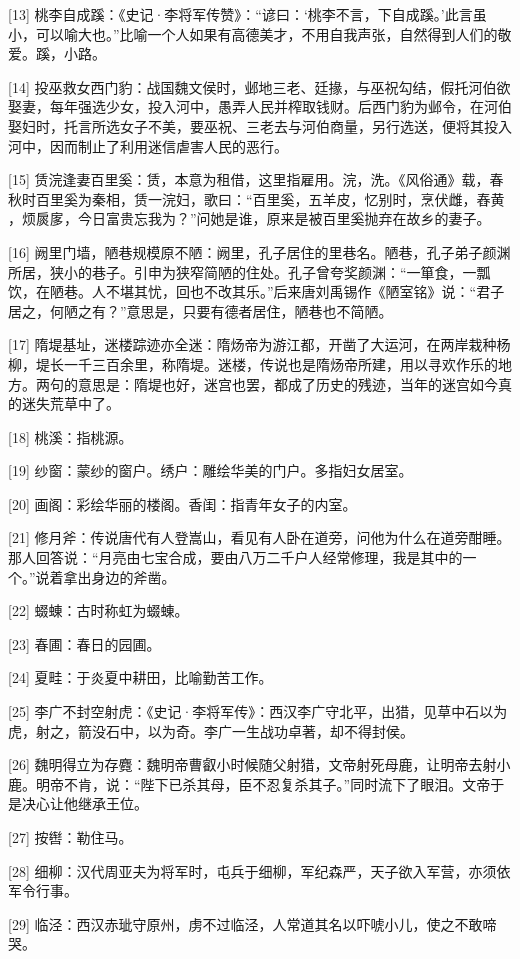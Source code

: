 \documentclass[12pt,UTF8]{ctexbook}
\begin{document}
[13] 桃李自成蹊：《史记·李将军传赞》：“谚曰：‘桃李不言，下自成蹊。’此言虽小，可以喻大也。”比喻一个人如果有高德美才，不用自我声张，自然得到人们的敬爱。蹊，小路。

[14] 投巫救女西门豹：战国魏文侯时，邺地三老、廷掾，与巫祝勾结，假托河伯欲娶妻，每年强选少女，投入河中，愚弄人民并榨取钱财。后西门豹为邺令，在河伯娶妇时，托言所选女子不美，要巫祝、三老去与河伯商量，另行选送，便将其投入河中，因而制止了利用迷信虐害人民的恶行。

[15] 赁浣逢妻百里奚：赁，本意为租借，这里指雇用。浣，洗。《风俗通》载，春秋时百里奚为秦相，赁一浣妇，歌曰：“百里奚，五羊皮，忆别时，烹伏雌，舂黄 ，烦扊扅，今日富贵忘我为？”问她是谁，原来是被百里奚抛弃在故乡的妻子。

[16] 阙里门墙，陋巷规模原不陋：阙里，孔子居住的里巷名。陋巷，孔子弟子颜渊所居，狭小的巷子。引申为狭窄简陋的住处。孔子曾夸奖颜渊：“一箪食，一瓢饮，在陋巷。人不堪其忧，回也不改其乐。”后来唐刘禹锡作《陋室铭》说：“君子居之，何陋之有？”意思是，只要有德者居住，陋巷也不简陋。

[17] 隋堤基址，迷楼踪迹亦全迷：隋炀帝为游江都，开凿了大运河，在两岸栽种杨柳，堤长一千三百余里，称隋堤。迷楼，传说也是隋炀帝所建，用以寻欢作乐的地方。两句的意思是：隋堤也好，迷宫也罢，都成了历史的残迹，当年的迷宫如今真的迷失荒草中了。

[18] 桃溪：指桃源。

[19] 纱窗：蒙纱的窗户。绣户：雕绘华美的门户。多指妇女居室。

[20] 画阁：彩绘华丽的楼阁。香闺：指青年女子的内室。

[21] 修月斧：传说唐代有人登嵩山，看见有人卧在道旁，问他为什么在道旁酣睡。那人回答说：“月亮由七宝合成，要由八万二千户人经常修理，我是其中的一个。”说着拿出身边的斧凿。

[22] 蝃蝀：古时称虹为蝃蝀。

[23] 春圃：春日的园圃。

[24] 夏畦：于炎夏中耕田，比喻勤苦工作。

[25] 李广不封空射虎：《史记·李将军传》：西汉李广守北平，出猎，见草中石以为虎，射之，箭没石中，以为奇。李广一生战功卓著，却不得封侯。

[26] 魏明得立为存麑：魏明帝曹叡小时候随父射猎，文帝射死母鹿，让明帝去射小鹿。明帝不肯，说：“陛下已杀其母，臣不忍复杀其子。”同时流下了眼泪。文帝于是决心让他继承王位。

[27] 按辔：勒住马。

[28] 细柳：汉代周亚夫为将军时，屯兵于细柳，军纪森严，天子欲入军营，亦须依军令行事。

[29] 临泾：西汉赤玼守原州，虏不过临泾，人常道其名以吓唬小儿，使之不敢啼哭。
\end{document}
